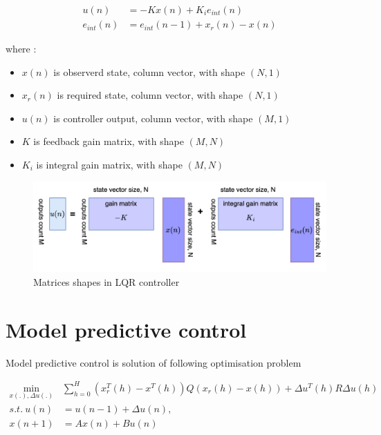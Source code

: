 \documentclass[12pt,twoside,onecolumn,openany,extrafontsizes,dvipsnames]{memoir}
\begin{document}
        \begin{align}
            u(n)&= -Kx(n) + K_ie_{int}(n) \label{eq:lqr_integral_action} \\
            e_{int}(n)& = e_{int}(n-1) + x_r(n) - x(n)
        \end{align}

        where : 
        \begin{itemize}
            \item $x(n)$ is observerd state, column vector, with shape $(N, 1)$
            \item $x_r(n)$ is required state, column vector, with shape $(N, 1)$
            \item $u(n)$ is controller output, column vector, with shape $(M, 1)$
            \item $K$ is feedback gain matrix, with shape $(M, N)$
            \item $K_i$ is integral gain matrix, with shape $(M, N)$ 
        \end{itemize}


        \begin{figure}[!htb]
            \centering
            \includegraphics[scale=0.8]{../diagrams/control_generic/control_generic-lqr_detail.png}
            \caption{Matrices shapes in LQR controller}
            \label{fig:control_lqr_matrices_shape}
        \end{figure}
        
    \newpage
    \section{Model predictive control}
        Model predictive control is solution of following optimisation problem

        \begin{align}
            \min_{x(.), \Delta u(.)} &\sum_{h=0}^H (x_r^T(h) - x^T(h))Q(x_r(h) - x(h)) + \Delta u^T(h)R\Delta u(h) \\
            s.t.\ u(n) &= u(n-1) + \Delta u(n), \\
            x(n+1) &= Ax(n) + Bu(n)
        \end{align}
\end{document}
